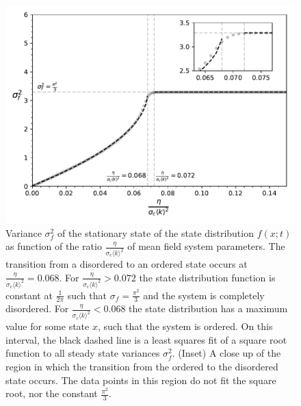 \begin{figure}[tbp]
	\centering
	\includegraphics[width=0.7\linewidth]{figures/cont_mean_field_variance_zoom}
	\caption{Variance $\sigma_f^2$ of the stationary state of the state distribution $f(x;t)$ as function of the ratio $\frac{\eta}{\sigma_c\langle k \rangle^2}$ of mean field system parameters. The transition from a disordered to an ordered state occurs at $\frac{\eta}{\sigma_c\langle k \rangle^2} =0.068$. For $\frac{\eta}{\sigma_c\langle k \rangle^2} > 0.072$ the state distribution function is constant at $\frac{1}{2\pi}$ such that $\sigma_f=\frac{\pi^2}{3}$ and the system is completely disordered. For $\frac{\eta}{\sigma_c\langle k \rangle^2} < 0.068$ the state distribution has a maximum value for some state $x$, such that the system is ordered. On this interval, the black dashed line is a least squares fit of a square root function to all steady state variances $\sigma_f^2$. (Inset) A close up of the region in which the transition from the ordered to the disordered state occurs. The data points in this region do not fit the square root, nor the constant $\frac{\pi^2}{3}$. }
	\label{fig:cont_mean_field_variance_zoom}
\end{figure}

